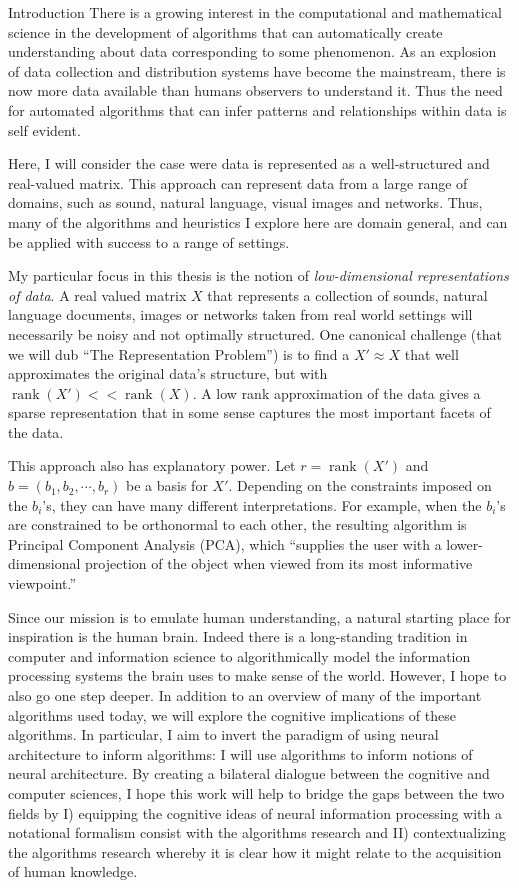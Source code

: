 \documentclass[12pt]{pom_thesis}
\begin{document}
\begin{chapter}{Introduction}
	There is a growing interest in the computational and mathematical science in the development of algorithms that can automatically create understanding about data corresponding to some phenomenon. As an explosion of data collection and distribution systems have become the mainstream, there is now more data available than humans observers to understand it. Thus the need for automated algorithms that can infer patterns and relationships within data is self evident. 
	
	Here, I will consider the case were data is represented as a well-structured and  real-valued matrix. This approach can represent data from a large range of domains, such as sound, natural language, visual images and networks. Thus, many of the algorithms and heuristics I explore here are domain general, and can be applied with success to a range of settings. 
	
	My particular focus in this thesis is the notion of \textit{low-dimensional representations of data}. A real valued matrix $X$ that represents a collection of sounds, natural language documents, images or networks taken from real world settings will necessarily be noisy and not optimally structured. One canonical challenge (that we will dub ``The Representation Problem'') is to find a $X' \approx X$ that well approximates the original data's structure, but with $\operatorname{rank}(X') << \operatorname{rank}(X)$. A low rank approximation of the data gives a sparse representation that in some sense captures the most important facets of the data. 
	
	This approach also has explanatory power. Let $r = \operatorname{rank}(X')$ and $b= (b_1,b_2,\cdots,b_r)$ be a basis for $X'$. Depending on the constraints imposed on the $b_i$'s, they can have many different interpretations. For example, when the $b_i$'s are constrained to be orthonormal to each other, the resulting algorithm is Principal Component Analysis (PCA), which ``supplies the user with a lower-dimensional projection of the object when viewed from its most informative viewpoint.'' 
	
	Since our mission is to emulate human understanding, a natural starting place for inspiration is the human brain. Indeed there is a long-standing tradition in computer and information science to algorithmically model the information processing systems the brain uses to make sense of the world. However, I hope to also go one step deeper. In addition to an overview of many of the important algorithms used today, we will explore the cognitive implications of these algorithms. In particular, I aim to invert the paradigm of using neural architecture to inform algorithms: I will use algorithms to inform notions of neural architecture. By creating a bilateral dialogue between the cognitive and computer sciences, I hope this work will help to bridge the gaps between the two fields by I) equipping the cognitive ideas of neural information processing with a notational formalism consist with the algorithms research and II) contextualizing the algorithms research whereby it is clear how it might relate to the acquisition of human knowledge.
\end{chapter}
\end{document}
